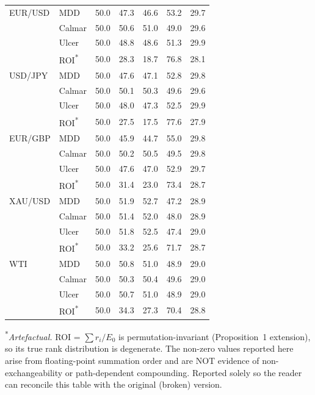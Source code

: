 \begin{table}[ht]
\begin{tabular}{llrrrrr}
\midrule
EUR/USD & MDD & 50.0 & 47.3 & 46.6 & 53.2 & 29.7 \\
 & Calmar & 50.0 & 50.6 & 51.0 & 49.0 & 29.6 \\
 & Ulcer & 50.0 & 48.8 & 48.6 & 51.3 & 29.9 \\
 & ROI\textsuperscript{*} & 50.0 & 28.3 & 18.7 & 76.8 & 28.1 \\
\midrule
USD/JPY & MDD & 50.0 & 47.6 & 47.1 & 52.8 & 29.8 \\
 & Calmar & 50.0 & 50.1 & 50.3 & 49.6 & 29.6 \\
 & Ulcer & 50.0 & 48.0 & 47.3 & 52.5 & 29.9 \\
 & ROI\textsuperscript{*} & 50.0 & 27.5 & 17.5 & 77.6 & 27.9 \\
\midrule
EUR/GBP & MDD & 50.0 & 45.9 & 44.7 & 55.0 & 29.8 \\
 & Calmar & 50.0 & 50.2 & 50.5 & 49.5 & 29.8 \\
 & Ulcer & 50.0 & 47.6 & 47.0 & 52.9 & 29.7 \\
 & ROI\textsuperscript{*} & 50.0 & 31.4 & 23.0 & 73.4 & 28.7 \\
\midrule
XAU/USD & MDD & 50.0 & 51.9 & 52.7 & 47.2 & 28.9 \\
 & Calmar & 50.0 & 51.4 & 52.0 & 48.0 & 28.9 \\
 & Ulcer & 50.0 & 51.8 & 52.5 & 47.4 & 29.0 \\
 & ROI\textsuperscript{*} & 50.0 & 33.2 & 25.6 & 71.7 & 28.7 \\
\midrule
WTI & MDD & 50.0 & 50.8 & 51.0 & 48.9 & 29.0 \\
 & Calmar & 50.0 & 50.3 & 50.4 & 49.6 & 29.0 \\
 & Ulcer & 50.0 & 50.7 & 51.0 & 48.9 & 29.0 \\
 & ROI\textsuperscript{*} & 50.0 & 34.3 & 27.3 & 70.4 & 28.8 \\
\bottomrule
\end{tabular}
\medskip
\footnotesize
\textsuperscript{*}\emph{Artefactual.} ROI = $\sum r_i / E_0$ is permutation-invariant (Proposition~1 extension), so its true rank distribution is degenerate. The non-zero values reported here arise from floating-point summation order and are NOT evidence of non-exchangeability or path-dependent compounding. Reported solely so the reader can reconcile this table with the original (broken) version.
\end{table}
